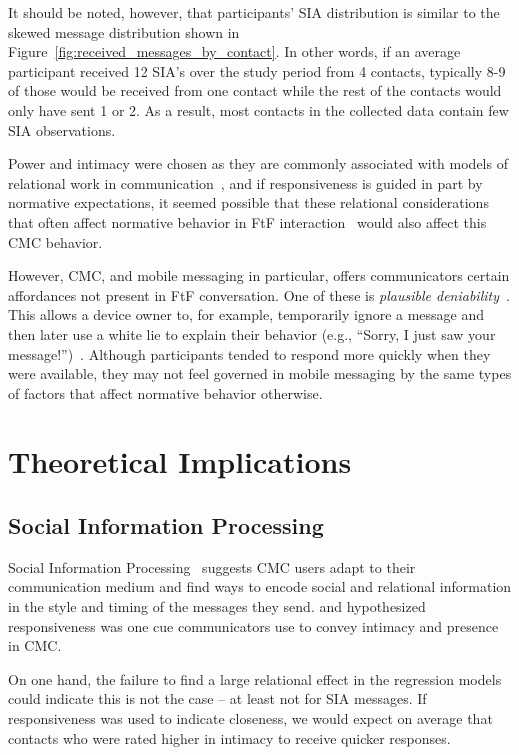 \documentclass[12pt]{nuthesis}	%
\begin{document}
It should be noted, however, that participants' SIA distribution is similar to the skewed message distribution shown in Figure~\ref{fig:received_messages_by_contact}. In other words, if an average participant received 12 SIA's over the study period from 4 contacts, typically 8-9 of those would be received from one contact while the rest of the contacts would only have sent 1 or 2. As a result, most contacts in the collected data contain few SIA observations.

Power and intimacy were chosen as they are commonly associated with models of relational work in communication~\citep{brown1987politeness,spencer2011conceptualising}, and if responsiveness is guided in part by normative expectations, it seemed possible that these relational considerations that often affect normative behavior in FtF interaction~\citep[e.g.,][]{guerrero1991waxing,henley1973power,leffler1982effects,sternglanz2004reading} would also affect this CMC behavior.

However, CMC, and mobile messaging in particular, offers communicators certain affordances not present in FtF conversation. One of these is \textit{plausible deniability}~\citep{lederer2004personal,nardi2000interaction}. This allows a device owner to, for example, temporarily ignore a message and then later use a white lie to explain their behavior (e.g., ``Sorry, I just saw your  message!'')~\citep{hancock2009butler}. Although participants tended to respond more quickly when they were available, they may not feel governed in mobile messaging by the same types of factors that affect normative behavior otherwise.

\section{Theoretical Implications}

\subsection{Social Information Processing}

Social Information Processing~\citep{walther1992interpersonal} suggests CMC users adapt to their communication medium and find ways to encode social and relational information in the style and timing of the messages they send. \citet{walther1995nonverbal} and \citet{kalman2006pauses} hypothesized responsiveness was one cue communicators use to convey intimacy and presence in CMC.

On one hand, the failure to find a large relational effect in the regression models could indicate this is not the case -- at least not for SIA messages. If responsiveness was used to indicate closeness, we would expect on average that contacts who were rated higher in intimacy to receive quicker responses.
\end{document}
